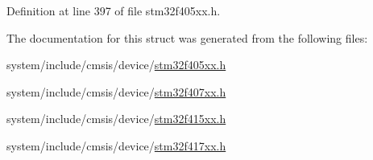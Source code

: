 Definition at line 397 of file stm32f405xx.\+h.



The documentation for this struct was generated from the following files\+:\begin{DoxyCompactItemize}
\item 
system/include/cmsis/device/\hyperlink{stm32f405xx_8h}{stm32f405xx.\+h}\item 
system/include/cmsis/device/\hyperlink{stm32f407xx_8h}{stm32f407xx.\+h}\item 
system/include/cmsis/device/\hyperlink{stm32f415xx_8h}{stm32f415xx.\+h}\item 
system/include/cmsis/device/\hyperlink{stm32f417xx_8h}{stm32f417xx.\+h}\end{DoxyCompactItemize}
